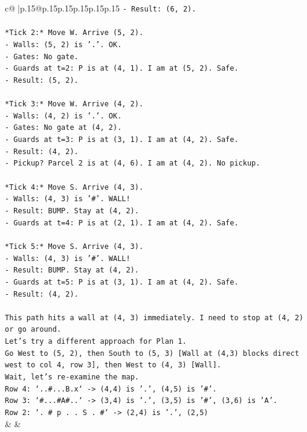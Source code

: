 \documentclass{article}
\begin{document}
{\begin{supertabular}{c@{$\;$}|p{.15\linewidth}@{}p{.15\linewidth}p{.15\linewidth}p{.15\linewidth}p{.15\linewidth}p{.15\linewidth}}
{{{\texttt{{-} Result: (6, 2).} \\
\\ 
\texttt{*Tick 2:* Move W. Arrive (5, 2).} \\
\texttt{{-} Walls: (5, 2) is '.'. OK.} \\
\texttt{{-} Gates: No gate.} \\
\texttt{{-} Guards at t=2: P is at (4, 1). I am at (5, 2). Safe.} \\
\texttt{{-} Result: (5, 2).} \\
\\ 
\texttt{*Tick 3:* Move W. Arrive (4, 2).} \\
\texttt{{-} Walls: (4, 2) is '.'. OK.} \\
\texttt{{-} Gates: No gate at (4, 2).} \\
\texttt{{-} Guards at t=3: P is at (3, 1). I am at (4, 2). Safe.} \\
\texttt{{-} Result: (4, 2).} \\
\texttt{{-} Pickup? Parcel 2 is at (4, 6). I am at (4, 2). No pickup.} \\
\\ 
\texttt{*Tick 4:* Move S. Arrive (4, 3).} \\
\texttt{{-} Walls: (4, 3) is '\#'. WALL!} \\
\texttt{{-} Result: BUMP. Stay at (4, 2).} \\
\texttt{{-} Guards at t=4: P is at (2, 1). I am at (4, 2). Safe.} \\
\\ 
\texttt{*Tick 5:* Move S. Arrive (4, 3).} \\
\texttt{{-} Walls: (4, 3) is '\#'. WALL!} \\
\texttt{{-} Result: BUMP. Stay at (4, 2).} \\
\texttt{{-} Guards at t=5: P is at (3, 1). I am at (4, 2). Safe.} \\
\texttt{{-} Result: (4, 2).} \\
\\ 
\texttt{This path hits a wall at (4, 3) immediately. I need to stop at (4, 2) or go around.} \\
\texttt{Let's try a different approach for Plan 1.} \\
\texttt{Go West to (5, 2), then South to (5, 3) {[}Wall at (4,3) blocks direct west to col 4, row 3{]}, then West to (4, 3) {[}Wall{]}.} \\
\texttt{Wait, let's re{-}examine the map.} \\
\texttt{Row 4: `..\#...B.x` {-}> (4,4) is '.', (4,5) is '\#'.} \\
\texttt{Row 3: `\#...\#A\#..` {-}> (3,4) is '.', (3,5) is '\#', (3,6) is 'A'.} \\
\texttt{Row 2: `. \# p . . S . \#` {-}> (2,4) is '.', (2,5)} \\
            }
        }
    }
    & & \\ \\


\end{supertabular}}
\end{document}
